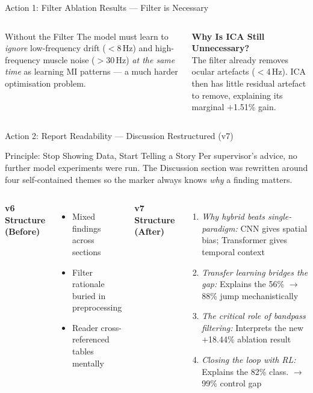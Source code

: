 \documentclass[aspectratio=169, 11pt]{beamer}
\begin{document}
\begin{frame}{Action 1: Filter Ablation Results --- Filter is Necessary}
\begin{columns}[T]
        \vspace{3mm}
        \begin{alertblock}{Without the Filter}
            The model must learn to \emph{ignore} low-frequency drift ($<$8\,Hz) and high-frequency muscle noise ($>$30\,Hz) \emph{at the same time} as learning MI patterns --- a much harder optimisation problem.
        \end{alertblock}

        \vspace{3mm}
        \textbf{Why Is ICA Still Unnecessary?}\\
        The filter already removes ocular artefacts ($<$4\,Hz). ICA then has little residual artefact to remove, explaining its marginal $+$1.51\% gain.
    \end{columns}
\end{frame}

\begin{frame}{Action 2: Report Readability --- Discussion Restructured (v7)}

    \begin{block}{Principle: Stop Showing Data, Start Telling a Story}
        Per supervisor's advice, no further model experiments were run. The Discussion section was rewritten around four self-contained themes so the marker always knows \emph{why} a finding matters.
    \end{block}

    \vspace{2mm}
    \begin{columns}[T]
        \textbf{v6 Structure (Before)}
        \begin{itemize}
            \small
            \item Mixed findings across sections
            \item Filter rationale buried in preprocessing
            \item Reader cross-referenced tables mentally
        \end{itemize}

        \textbf{v7 Structure (After)}
        \begin{enumerate}
            \footnotesize
            \item \textit{Why hybrid beats single-paradigm:} CNN gives spatial bias; Transformer gives temporal context
            \item \textit{Transfer learning bridges the gap:} Explains the 56\% $\to$ 88\% jump mechanistically
            \item \textit{The critical role of bandpass filtering:} Interprets the new $+$18.44\% ablation result
            \item \textit{Closing the loop with RL:} Explains the 82\% class. $\to$ 99\% control gap
        \end{enumerate}
    \end{columns}
\end{frame}
\end{document}
